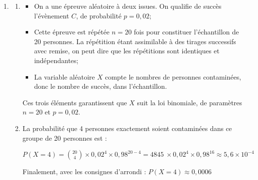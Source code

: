 \documentclass[10pt]{article}
\providecommand{\np}[2][]{{#2~#1}}
\begin{document}
\begin{enumerate}
\begin{enumerate}
Cette affirmation est \textbf{vraie}, car on a calculé qu'environ 1,38~\% des personnes vaccinées ont été contaminées par le virus, donc, par complémentaire, cela implique qu'environ 98,62~\% des personnes vaccinées n'ont pas été contaminées. Il est donc correct de dire que c'est plus de 98~\%.
	\end{enumerate}
\item
	\begin{enumerate}
		\item 
\begin{itemize}
\item On a une épreuve aléatoire à deux issues. On qualifie de succès l'évènement $C$, de probabilité $p = 0,02$;
\item Cette épreuve est répétée $n =20$ fois pour constituer l'échantillon de 20 personnes. La répétition étant assimilable à des tirages successifs avec remise, on peut dire que les répétitions sont identiques et indépendantes;
\item La variable aléatoire $X$ compte le nombres de personnes contaminées, donc le nombre de succès, dans l'échantillon.
\end{itemize}

Ces trois éléments garantissent que $X$ suit la loi binomiale, de paramètres $n = 20$ et $p = 0,02$.

		\item La probabilité que 4 personnes exactement soient contaminées dans ce groupe de 20 personnes est :

			$P(X = 4) = \displaystyle \binom{20}{4}\times 0,02^4 \times 0,98^{20 - 4} = \np{4845}\times 0,02^4 \times 0,98^{16} \approx 5,6\times 10^{-4}$

Finalement, avec les consignes d'arrondi : \quad $P(X = 4) \approx 0,0006$
	\end{enumerate}
\end{enumerate}

\medskip
\end{document}
